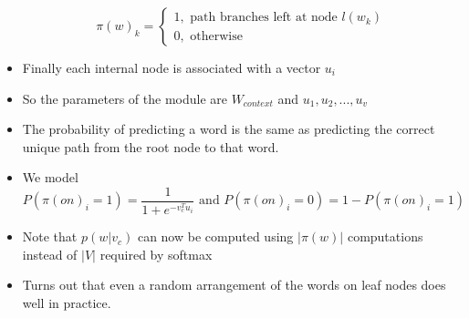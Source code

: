 \documentclass[a4paper]{article}
\begin{document}
\begin{itemize}
\begin{equation*}
        \pi(w)_k=\begin{cases}
            1,\text{ path branches left at node }l(w_k)\\
            0,\text{ otherwise}
        \end{cases}
    \end{equation*}
    \item Finally each internal node is associated with a vector $u_i$
    \item So the parameters of the module are $W_{context}$ and $u_1, u_2, . . . , u_v$ 
    \item The probability of predicting a word is the same as predicting the correct unique path from the root node to that word.
    \item We model
    \begin{equation*}
        P(\pi(on)_i=1)=\frac{1}{1+e^{-v_c^Tu_i}}\text{ and }P(\pi(on)_i=0)=1-P(\pi(on)_i=1)
    \end{equation*}
    \item Note that $p(w|v_c)$ can now be computed using $|\pi(w)|$ computations instead of $|V|$ required by softmax
    \item Turns out that even a random arrangement of the words on leaf nodes does well in practice.
\end{itemize}
\end{document}
